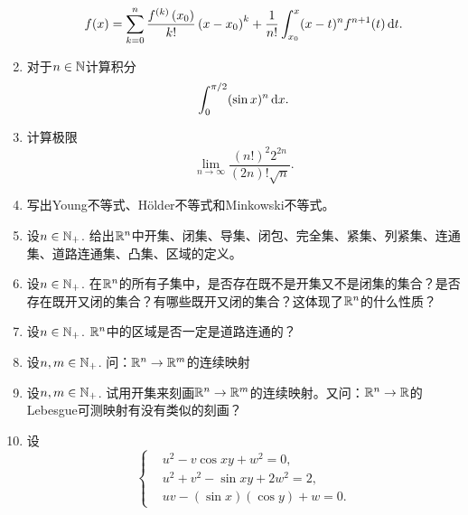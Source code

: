 \begin{enumerate}
\begin{equation*}
        f(x)=\sum_{k=0}^{n}\frac{f^{(k)}\left(x_0\right)}{k!}\left(x-x_0\right)^k+\frac{1}{n!}\int_{x_0}^x (x-t)^n f^{n+1}(t)\mathop{}\!\mathrm{d} t.
    \end{equation*}
    \item 对于$n\in \mathbb{N}$计算积分\begin{equation*}
        \int_0^{\pi/2}(\sin x)^n\mathop{}\!\mathrm{d} x.
    \end{equation*}
    \item 计算极限\begin{equation*}
        \lim_{n\to \infty}\frac{(n!)^2 2^{2n}}{(2n)!\sqrt{n}}.
    \end{equation*}
    \item 写出Young不等式、H\"older不等式和Minkowski不等式。
    \item 设$n\in\mathbb{N_+}$. 给出$\mathbb{R}^n$中开集、闭集、导集、闭包、完全集、紧集、列紧集、连通集、道路连通集、凸集、区域的定义。
    \item 设$n\in\mathbb{N_+}$. 在$\mathbb{R}^n$的所有子集中，是否存在既不是开集又不是闭集的集合？是否存在既开又闭的集合？有哪些既开又闭的集合？这体现了$\mathbb{R}^n$的什么性质？
    \item 设$n\in\mathbb{N_+}$. $\mathbb{R}^n$中的区域是否一定是道路连通的？
    \item 设$n,m\in\mathbb{N_+}$. 问：$\mathbb{R}^n\to\mathbb{R}^m$的连续映射\\
    \item 设$n,m\in\mathbb{N_+}$. 试用开集来刻画$\mathbb{R}^n\to\mathbb{R}^m$的连续映射。又问：$\mathbb{R}^n\to\mathbb{R}$的Lebesgue可测映射有没有类似的刻画？
    \item 设\begin{equation*}
        \left\{\begin{aligned}
            &u^2-v\cos xy+w^2=0,\\
            &u^2+v^2-\sin xy+2w^2=2,\\
            &uv-(\sin x)(\cos y)+w=0.

\end{aligned}
\end{equation*}
\end{enumerate}
